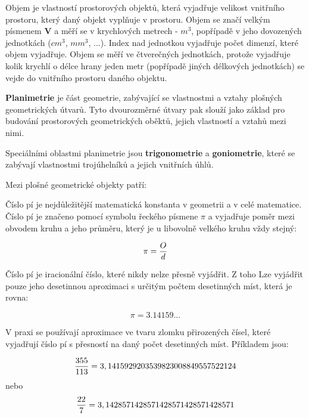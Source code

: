 
Objem je vlastností prostorových objektů, která vyjadřuje velikost vnitřního prostoru, který daný objekt vyplňuje v prostoru. Objem se značí velkým písmenem {\bf  V} a měří se v krychlových metrech - $m^3$, popřípadě v jeho dovozených jednotkách ($cm^3$, $mm^3$, ...). Index nad jednotkou vyjadřuje počet dimenzí, které objem vyjadřuje. Objem se měří ve čtverečných jednotkách, protože vyjadřuje kolik krychlí o délce hrany jeden metr (popřípadě jiných délkových jednotkách) se vejde do vnitřního prostoru daného objektu.

\vskip 4mm
\centerline{}
\vskip 4mm


{\bf Planimetrie} je část geometrie, zabývající se vlastnostmi a vztahy plošných geometrických útvarů. Tyto dvourozměrné útvary pak slouží jako základ pro budování prostorových geometrických oběktů, jejich vlastností a vztahů mezi nimi. 

Speciálními oblastmi planimetrie jsou {\bf trigonometrie} a {\bf goniometrie}, které se zabývají vlastnostmi trojúhelníků a jejich vnitřních úhlů.

Mezi plošné geometrické objekty patří:

\vskip 4mm
\vskip 4mm



Číslo pí je nejdůležitější matematická konstanta v geometrii a v celé matematice. Číslo pí je značeno pomocí symbolu řeckého písmene $\pi$ a vyjadřuje poměr mezi obvodem kruhu a jeho průměru, který je u libovolně velkého kruhu vždy stejný:

$$ \pi = {O \over d} $$

\vskip 4mm
\centerline{}
\vskip 4mm

Číslo pí je iracionální číslo, které nikdy nelze přesně vyjádřit. Z toho  Lze vyjádřit pouze jeho desetinnou aproximaci s určitým počtem desetinných míst, která je rovna:

$$ \pi = 3.14159... $$

V praxi se používají aproximace ve tvaru zlomku přirozených čísel, které vyjadřují číslo pí s přesností na daný počet desetinných míst. Příkladem jsou:

$$ {355 \over 113} = 3,1415929203539823008849557522124 $$
nebo 
$$ {22 \over 7} = 3,1428571428571428571428571428571 $$

